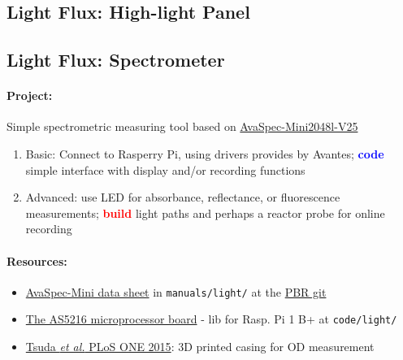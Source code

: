 \documentclass[12pt,a4paper]{scrartcl}
\newcommand{\git}[0]{\href{https://github.com/raim/PBR}{PBR git}}
\newcommand{\build}[0]{\textcolor{red}{\textbf{build}}}
\newcommand{\code}[0]{\textcolor{blue}{\textbf{code}}}
\begin{document}
\clearpage
\subsection{Light Flux: High-light Panel} 
\label{led}

\clearpage
\subsection{Light Flux: Spectrometer} 
\label{spec}
\paragraph{Project:} 
Simple spectrometric measuring tool based on
\href{http://www.avantes.com/products/spectrometers/compactline/item/723-avaspec-mini}{AvaSpec-Mini2048l-V25}

\begin{enumerate}
\item Basic: Connect to Rasperry Pi, using drivers provides by
  Avantes; \code{} simple interface with display and/or recording
  functions
\item Advanced: use LED for absorbance, reflectance, or fluorescence
  measurements; \build{} light paths and perhaps a reactor probe for
  online recording
\end{enumerate}


\paragraph{Resources:}
\begin{itemize}
\item
  \href{http://www.avantes.com/images/productsheets/AvaSpec_Mini5.pdf}{AvaSpec-Mini
    data sheet} in \texttt{manuals/light/} at the \git{}
\item \href{http://www.avantes.com/products/oem/item/220-oem-spectrometers-as5216-microprocessor-board}{The AS5216 microprocessor board} - lib for Rasp. Pi 1 B+ at \texttt{code/light/}
\item \href{http://www.ncbi.nlm.nih.gov/pmc/articles/PMC4641590/}{Tsuda
    \textit{et al.} PLoS ONE 2015}: 3D printed casing for OD measurement
\end{itemize}
\end{document}
